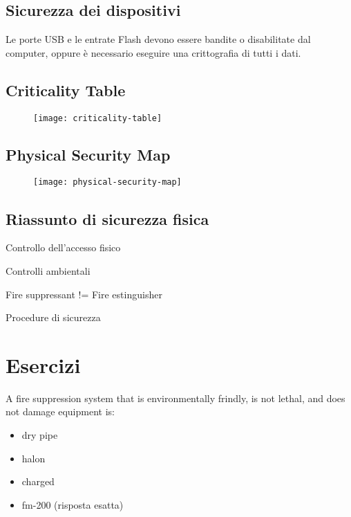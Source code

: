\subsection{Sicurezza dei dispositivi}

Le porte USB e le entrate Flash devono essere bandite o disabilitate dal 
computer, oppure è necessario eseguire una crittografia di tutti i dati.


\subsection{Criticality Table}

\begin{figure}[H]
 \centering
 \texttt{[image: criticality-table]}
\end{figure}

\subsection{Physical Security Map}
\begin{figure}[H]
 \centering
 \texttt{[image: physical-security-map]}
\end{figure}

\subsection{Riassunto di sicurezza fisica}

Controllo dell'accesso fisico

Controlli ambientali

Fire suppressant != Fire estinguisher

Procedure di sicurezza

\section{Esercizi}




A fire suppression system that is environmentally frindly, is not lethal, and 
does not damage equipment is:
\begin{itemize}
\item dry pipe
\item halon
\item charged
\item fm-200 (risposta esatta)
\end{itemize}

